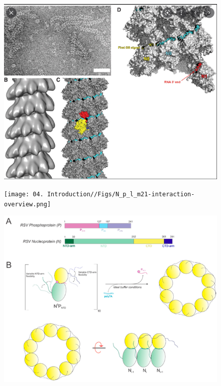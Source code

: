\begin{figure}
    \centering
    \includegraphics[width=0.5\linewidth]{04. Introduction//Figs/N-structure.png}
    
    
\end{figure}

\begin{figure}
    \centering
    \texttt{[image: 04. Introduction//Figs/N\_p\_l\_m21-interaction-overview.png]}
    
    
\end{figure}

\begin{figure}
    \centering
    \includegraphics[width=0.5\linewidth]{04. Introduction//Figs/n-p interaction.png}
    
    
\end{figure}




